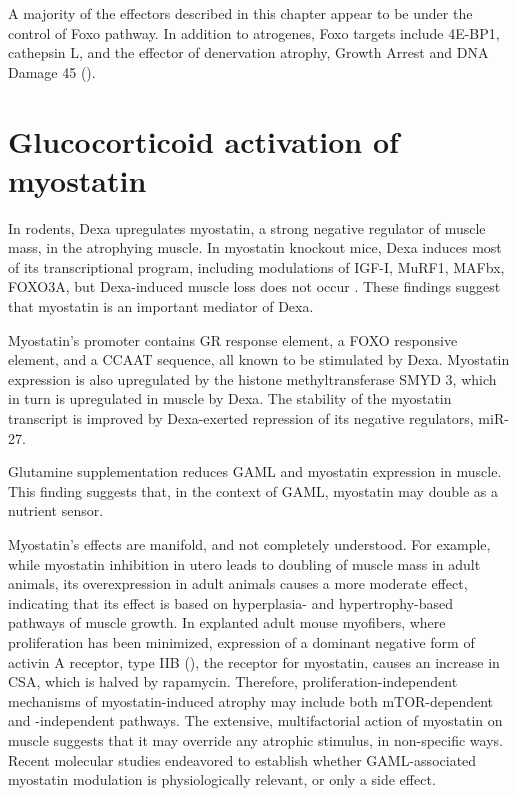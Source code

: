 \documentclass[12pt,english]{report}\usepackage[]{graphicx}\usepackage[]{color}
\begin{document}
A majority of the effectors described in this chapter appear to be
under the control of Foxo pathway. In addition to atrogenes, Foxo
targets include 4E-BP1, cathepsin L, and the effector of denervation
atrophy, Growth Arrest and DNA Damage 45 ()\citep{bongers2013skeletal}.


\section{Glucocorticoid activation of myostatin}

In rodents, Dexa upregulates myostatin, a strong negative regulator
of muscle mass, in the atrophying muscle\citep{ma2003glucocorticoid-induced}.
In myostatin knockout mice, Dexa induces most of its transcriptional
program, including modulations of IGF-I, MuRF1, MAFbx, FOXO3A, but
Dexa-induced muscle loss does not occur \citep{gilson2007myostatin}.
These findings suggest that myostatin is an important mediator of
Dexa.

Myostatin's promoter contains GR response element\citep{ma2003glucocorticoid-induced},
a FOXO responsive element\citep{allen2007regulation}, and a CCAAT
sequence\citep{allen2010ccaat/enhancer}, all known to be stimulated
by Dexa. Myostatin expression is also upregulated by the histone methyltransferase
SMYD 3, which in turn is upregulated in muscle by Dexa\citep{proserpio2013methyltransferase}.
The stability of the myostatin transcript is improved by Dexa-exerted
repression of its negative regulators, miR-27\citep{allen2011posttranscriptional}.

Glutamine supplementation reduces GAML and myostatin expression in
muscle\citep{salehian2006effect}. This finding suggests that, in
the context of GAML, myostatin may double as a nutrient sensor. 

Myostatin's effects are manifold, and not completely understood. For
example, while myostatin inhibition in utero leads to doubling of
muscle mass in adult animals\citep{mcpherron1997regulation}, its
overexpression in adult animals causes a more moderate effect\citep{zimmers2002induction},
indicating that its effect is based on hyperplasia- and hypertrophy-based
pathways of muscle growth. In explanted adult mouse myofibers, where
proliferation has been minimized, expression of a dominant negative
form of activin A receptor, type IIB (),
the receptor for myostatin, causes an increase in CSA, which is halved
by rapamycin\citep{sartori2009smad2}. Therefore, proliferation-independent
mechanisms of myostatin-induced atrophy may include both mTOR-dependent
and -independent pathways. The extensive, multifactorial action of
myostatin on muscle suggests that it may override any atrophic stimulus,
in non-specific ways. Recent molecular studies endeavored to establish
whether GAML-associated myostatin modulation is physiologically relevant,
or only a side effect.
\end{document}
